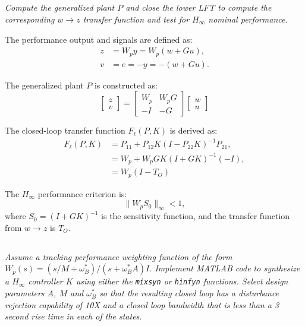 \documentclass{article}
\begin{document}
\subsection{}
\textit{Compute the generalized plant $P$ and close the lower LFT to compute the corresponding $w \to z$ transfer function and test for $H_\infty$ nominal performance.}

The performance output and signals are defined as:
\[
\begin{aligned}
z &= W_p y = W_p (w + Gu), \\
v &= e = -y = -(w + Gu).
\end{aligned}
\]

The generalized plant \(P\) is constructed as:
\[
\begin{bmatrix}
z \\
v
\end{bmatrix}
=
\begin{bmatrix}
W_p & W_p G \\
-I & -G
\end{bmatrix}
\begin{bmatrix}
w \\
u
\end{bmatrix}
\]

The closed-loop transfer function \(F_\ell(P, K)\) is derived as:
\[
\begin{aligned}
F_\ell(P, K) &= P_{11} + P_{12} K (I - P_{22} K)^{-1} P_{21}, \\
&= W_p + W_p G K (I + G K)^{-1} (-I), \\
&= W_p (I - T_O)
\end{aligned}
\]

The \(H_\infty\) performance criterion is:
\[
\| W_p S_0 \|_\infty < 1,
\]
where \(S_0 = (I + G K)^{-1}\) is the sensitivity function, and the transfer function from \(w \to z\) is \(T_O\).

\subsection{}
\textit{Assume a tracking performance weighting function of the form $W_p(s) = (s/M + \omega_B^*)/(s + \omega_B^* A) I$. Implement MATLAB code to synthesize a $H_\infty$ controller $K$ using either the \texttt{mixsyn} or \texttt{hinfyn} functions. Select design parameters $A$, $M$ and $\omega_B^*$ so that the resulting closed loop has a disturbance rejection capability of 10X and a closed loop bandwidth that is less than a 3 second rise time in each of the states.}
\end{document}
